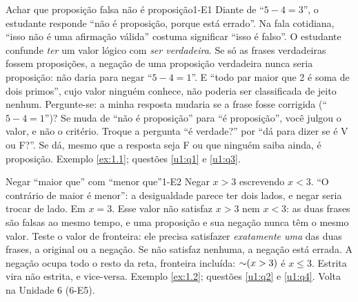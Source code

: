 \ErrosComuns

\begin{erro}{Achar que proposição falsa não é proposição}{1-E1}
 Diante de \enquote{$5-4=3$}, o estudante responde \enquote{não é proposição, porque está errado}.
 Na fala cotidiana, \enquote{isso não é uma afirmação válida} costuma significar \enquote{isso é falso}. O estudante confunde \emph{ter} um valor lógico com \emph{ser verdadeira}.
 Se só as frases verdadeiras fossem proposições, a negação de uma proposição verdadeira nunca seria proposição: não daria para negar \enquote{$5-4=1$}. E \enquote{todo par maior que 2 é soma de dois primos}, cujo valor ninguém conhece, não poderia ser classificada de jeito nenhum.
 Pergunte-se: a minha resposta mudaria se a frase fosse corrigida (\enquote{$5-4=1$})? Se muda de \enquote{não é proposição} para \enquote{é proposição}, você julgou o valor, e não o critério.
 Troque a pergunta \enquote{é verdade?} por \enquote{dá para dizer se é V ou F?}. Se dá, mesmo que a resposta seja F ou que ninguém saiba ainda, é proposição.
 Exemplo \ref{ex:1.1}; questões \ref{u1:q1} e \ref{u1:q3}.
\end{erro}

\begin{erro}{Negar \enquote{maior que} com \enquote{menor que}}{1-E2}
 Negar $x>3$ escrevendo $x<3$.
 \enquote{O contrário de maior é menor}: a desigualdade parece ter dois lados, e negar seria trocar de lado.
 Em $x=3$. Esse valor não satisfaz $x>3$ nem $x<3$: as duas frases são falsas ao mesmo tempo, e uma proposição e sua negação nunca têm o mesmo valor.
 Teste o valor de fronteira: ele precisa satisfazer \emph{exatamente uma} das duas frases, a original ou a negação. Se não satisfaz nenhuma, a negação está errada.
 A negação ocupa todo o resto da reta, fronteira incluída: ${{\sim}}(x>3)$ é $x\le 3$. Estrita vira não estrita, e vice-versa.
 Exemplo \ref{ex:1.2}; questões \ref{u1:q2} e \ref{u1:q4}. Volta na Unidade 6 (6-E5).
\end{erro}

